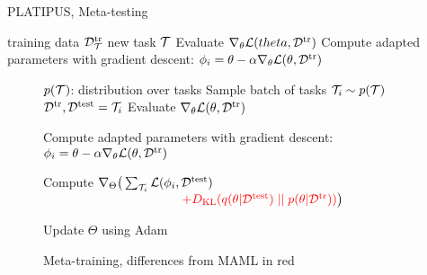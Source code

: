 \documentclass{article}
\begin{document}
\begin{algorithm}[h]
    \caption{PLATIPUS, Meta-testing}
    \small
    \label{alg:promamltest}
    \begin{algorithmic}[1]
    \Require training data $\mathcal{D}^\text{tr}_{\mathcal{T}}$ new task $\mathcal{T}$
    \Require {}
    \State {}
     \State Evaluate $\nabla_\theta \mathcal{L}(\\theta, \mathcal{D}^\text{tr})$
     \State Compute adapted parameters with gradient descent: $\phi_i=\theta-\alpha \nabla_\theta  \mathcal{L}(  \theta, \mathcal{D}^\text{tr})$
\end{algorithmic}
\end{algorithm}
\fi






\begin{figure*}[ttt!]
\begin{minipage}[t]{0.6\textwidth}
\begin{algorithm}[H]
    \caption{Meta-training, differences from MAML in red}
    \small
    \label{alg:promaml}
    \begin{algorithmic}[1]
    \Require $p(\mathcal{T})$: distribution over tasks
    \State {}
    \State Sample batch of tasks $\mathcal{T}_i \sim p(\mathcal{T})$
     \State $\mathcal{D}^\text{tr}, \mathcal{D}^\text{test} = \mathcal{T}_i$
     \State {}
\State {}
\State Evaluate $\nabla_\theta \mathcal{L}(\theta, \mathcal{D}^\text{tr})$
\State \begin{varwidth}[t]{\linewidth}
     Compute adapted parameters with gradient descent: \\
     $\phi_i =\theta-\alpha \nabla_\theta \mathcal{L}(\theta, \mathcal{D}^\text{tr})$
     \end{varwidth}
     \EndFor
\State {}
     \State \begin{varwidth}[t]{\linewidth} Compute $\nabla_\Theta \big( \sum_{\mathcal{T}_i}  \mathcal{L} ( \phi_i, \mathcal{D}^\text{test})$\\ 
     $~~~~~~~~~~~~~~~~~~~~~~~~~~~~~~~~~\textcolor{red}{+ D_\text{KL}(q(\theta | \mathcal{D}^\text{test}) \mid\mid p(\theta | \mathcal{D}^\text{tr}) )  } \big)$
     \end{varwidth}
     \State Update $\Theta$ using Adam

\end{algorithmic}
\end{algorithm}
\end{minipage}
\end{figure*}
\end{document}

